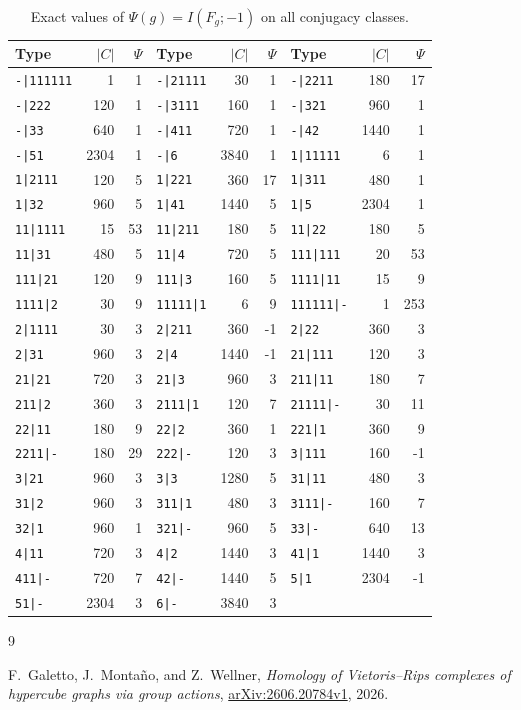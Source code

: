 \documentclass[11pt]{amsart}
\newcommand{\stype}[1]{\texttt{#1}}
\begin{document}
\begin{table}[htbp]
\centering
\scriptsize
\setlength{\tabcolsep}{3.2pt}
\begin{tabular}{@{}lrr@{\qquad}lrr@{\qquad}lrr@{}}
\toprule
Type & $|C|$ & $\Psi$ & Type & $|C|$ & $\Psi$ & Type & $|C|$ & $\Psi$\\
\midrule
\stype{-|111111} & 1 & 1 & \stype{-|21111} & 30 & 1
  & \stype{-|2211} & 180 & 17 \\
\stype{-|222} & 120 & 1 & \stype{-|3111} & 160 & 1
  & \stype{-|321} & 960 & 1 \\
\stype{-|33} & 640 & 1 & \stype{-|411} & 720 & 1
  & \stype{-|42} & 1440 & 1 \\
\stype{-|51} & 2304 & 1 & \stype{-|6} & 3840 & 1
  & \stype{1|11111} & 6 & 1 \\
\stype{1|2111} & 120 & 5 & \stype{1|221} & 360 & 17
  & \stype{1|311} & 480 & 1 \\
\stype{1|32} & 960 & 5 & \stype{1|41} & 1440 & 5
  & \stype{1|5} & 2304 & 1 \\
\stype{11|1111} & 15 & 53 & \stype{11|211} & 180 & 5
  & \stype{11|22} & 180 & 5 \\
\stype{11|31} & 480 & 5 & \stype{11|4} & 720 & 5
  & \stype{111|111} & 20 & 53 \\
\stype{111|21} & 120 & 9 & \stype{111|3} & 160 & 5
  & \stype{1111|11} & 15 & 9 \\
\stype{1111|2} & 30 & 9 & \stype{11111|1} & 6 & 9
  & \stype{111111|-} & 1 & 253 \\
\stype{2|1111} & 30 & 3 & \stype{2|211} & 360 & -1
  & \stype{2|22} & 360 & 3 \\
\stype{2|31} & 960 & 3 & \stype{2|4} & 1440 & -1
  & \stype{21|111} & 120 & 3 \\
\stype{21|21} & 720 & 3 & \stype{21|3} & 960 & 3
  & \stype{211|11} & 180 & 7 \\
\stype{211|2} & 360 & 3 & \stype{2111|1} & 120 & 7
  & \stype{21111|-} & 30 & 11 \\
\stype{22|11} & 180 & 9 & \stype{22|2} & 360 & 1
  & \stype{221|1} & 360 & 9 \\
\stype{2211|-} & 180 & 29 & \stype{222|-} & 120 & 3
  & \stype{3|111} & 160 & -1 \\
\stype{3|21} & 960 & 3 & \stype{3|3} & 1280 & 5
  & \stype{31|11} & 480 & 3 \\
\stype{31|2} & 960 & 3 & \stype{311|1} & 480 & 3
  & \stype{3111|-} & 160 & 7 \\
\stype{32|1} & 960 & 1 & \stype{321|-} & 960 & 5
  & \stype{33|-} & 640 & 13 \\
\stype{4|11} & 720 & 3 & \stype{4|2} & 1440 & 3
  & \stype{41|1} & 1440 & 3 \\
\stype{411|-} & 720 & 7 & \stype{42|-} & 1440 & 5
  & \stype{5|1} & 2304 & -1 \\
\stype{51|-} & 2304 & 3 & \stype{6|-} & 3840 & 3
  & & & \\
\bottomrule
\end{tabular}
\caption{Exact values of $\Psi(g)=I(F_g;-1)$ on all conjugacy classes.}
\label{tab:certificate}
\end{table}

\begin{thebibliography}{9}

F.~Galetto, J.~Monta\~no, and Z.~Wellner,
\emph{Homology of Vietoris--Rips complexes of hypercube graphs via group
actions},
\href{https://arxiv.org/abs/2606.20784}{arXiv:2606.20784v1}, 2026.

\end{thebibliography}
\end{document}
